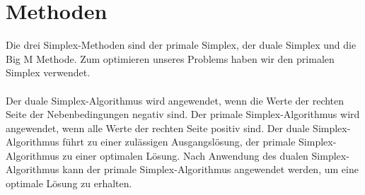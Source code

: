 \section{Methoden}

Die drei Simplex-Methoden sind der primale Simplex, der duale Simplex und die Big M Methode. Zum optimieren unseres Problems haben wir den primalen Simplex verwendet.\\\\
Der duale Simplex-Algorithmus wird angewendet, wenn die Werte der rechten Seite der Nebenbedingungen negativ sind. Der primale Simplex-Algorithmus wird angewendet, wenn alle Werte der rechten Seite positiv sind. Der duale Simplex-Algorithmus führt zu einer zulässigen Ausgangslösung, der primale Simplex-Algorithmus zu einer optimalen Lösung. Nach Anwendung des dualen Simplex-Algorithmus kann der primale Simplex-Algorithmus angewendet werden, um eine optimale Lösung zu erhalten. 
\\


